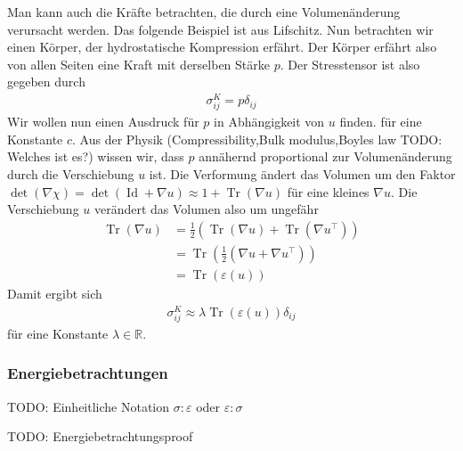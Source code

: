 \documentclass{scrartcl}
\def\R{\mathbb{R}}
\def\e{\varepsilon}
\DeclareMathOperator{\Id}{Id}             %
\DeclareMathOperator{\Tr}{Tr}       	  %
\begin{document}
Man kann auch die Kräfte betrachten, die durch eine Volumenänderung verursacht werden.
Das folgende Beispiel ist aus Lifschitz.
Nun betrachten wir einen Körper, der hydrostatische Kompression erfährt. Der Körper erfährt also von allen Seiten eine Kraft mit derselben Stärke $p$. Der Stresstensor ist also gegeben durch
\begin{align*}
	\sigma^K _{ij} = p\delta_{ij}
\end{align*}
Wir wollen nun einen Ausdruck für $p$ in Abhängigkeit von $u$ finden. 
für eine Konstante $c$. 
Aus der Physik (Compressibility,Bulk modulus,Boyles law TODO: Welches ist es?) wissen wir, dass $p$ annähernd proportional zur Volumenänderung durch die Verschiebung $u$ ist. Die Verformung ändert das Volumen um den Faktor $\det(\nabla\chi)=\det(\Id+\nabla u)\approx 1+\Tr(\nabla u)$ für eine kleines $\nabla u$. Die Verschiebung $u$ verändert das Volumen also um ungefähr
\begin{align*}
	\Tr\left(\nabla u\right)
	&= \frac{1}{2}\left(\Tr\left(\nabla u\right)+\Tr\left(\nabla u^\top\right)\right) \\
	&= \Tr\left(\frac{1}{2}\left(\nabla u+\nabla u^\top\right)\right) \\
	&= \Tr(\e(u))
\end{align*}
Damit ergibt sich
\begin{align*}
	\sigma^K _{ij} \approx \lambda\Tr(\e(u))\delta_{ij}
\end{align*}
für eine Konstante $\lambda\in\R$.

\subsubsection*{Energiebetrachtungen}

TODO: Einheitliche Notation $\sigma:\e$ oder $\e:\sigma$

TODO: Energiebetrachtungsproof
\end{document}
